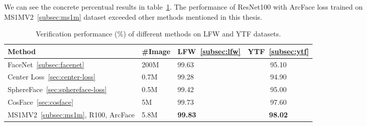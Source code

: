 We can see the concrete percentual results in table~\ref{tbl:arcfacecomp}.
The performance of ResNet100 with ArcFace loss trained on MS1MV2~\ref{subsec:ms1m} dataset exceeded other
methods mentioned in this thesis.

\begin{table}[H]
    \begin{tabularx}{\textwidth}{l|XXc}
        Method                & \#Image & LFW~\ref{subsec:lfw}            & YTF~\ref{subsec:ytf}            \\ \hline
        FaceNet~\ref{subsec:facenet}               & 200M    & 99.63          & 95.10          \\
        Center Loss~\ref{sec:center-loss}           & 0.7M    & 99.28          & 94.90          \\
        SphereFace~\ref{sec:sphereface-loss}            & 0.5M    & 99.42          & 95.00          \\
        CosFace~\ref{sec:cosface}               & 5M      & 99.73          & 97.60          \\
        MS1MV2~\ref{subsec:ms1m}, R100, ArcFace & 5.8M    & \textbf{99.83} & \textbf{98.02}
    \end{tabularx}
    \caption{Verification performance (\%) of different methods on LFW and YTF datasets.}
    \label{tbl:arcfacecomp}
\end{table}